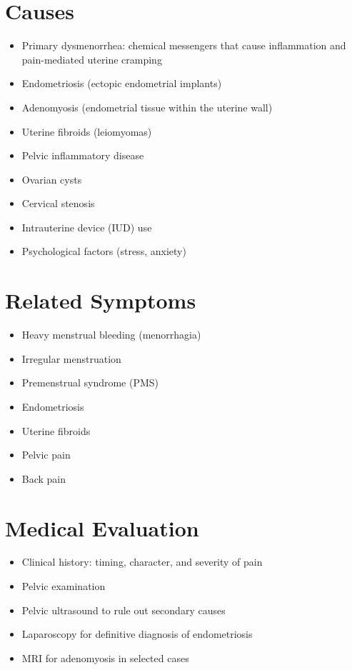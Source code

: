 \section*{Causes}
\begin{itemize}
\item Primary dysmenorrhea: chemical messengers that cause inflammation and pain-mediated uterine cramping
\item Endometriosis (ectopic endometrial implants)
\item Adenomyosis (endometrial tissue within the uterine wall)
\item Uterine fibroids (leiomyomas)
\item Pelvic inflammatory disease
\item Ovarian cysts
\item Cervical stenosis
\item Intrauterine device (IUD) use
\item Psychological factors (stress, anxiety)
\end{itemize}

\section*{Related Symptoms}
\begin{itemize}
\item Heavy menstrual bleeding (menorrhagia)
\item Irregular menstruation
\item Premenstrual syndrome (PMS)
\item Endometriosis
\item Uterine fibroids
\item Pelvic pain
\item Back pain
\end{itemize}

\section*{Medical Evaluation}
\begin{itemize}
\item Clinical history: timing, character, and severity of pain
\item Pelvic examination
\item Pelvic ultrasound to rule out secondary causes
\item Laparoscopy for definitive diagnosis of endometriosis
\item MRI for adenomyosis in selected cases
\end{itemize}

